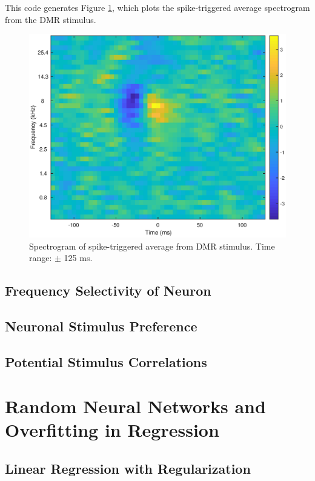 \documentclass[11pt, oneside]{article}
\begin{document}
This code generates Figure \ref{fig:sta_spectro}, which plots the spike-triggered average spectrogram from the DMR stimulus.

\begin{figure}[ht!]
\includegraphics[width=1\textwidth]{sta_spectro.eps}
\caption{Spectrogram of spike-triggered average from DMR stimulus. Time range: $\pm$ 125 ms.}
\label{fig:sta_spectro}
\end{figure}

\subsection{Frequency Selectivity of Neuron}

\subsection{Neuronal Stimulus Preference}

\subsection{Potential Stimulus Correlations}

\section{Random Neural Networks and Overfitting in Regression}

\subsection{Linear Regression with Regularization}
\end{document}
